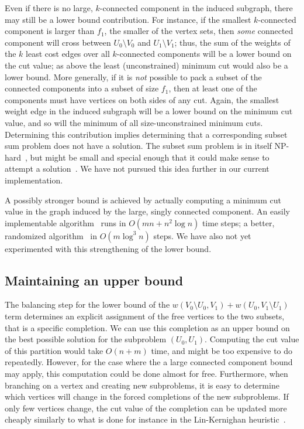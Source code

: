 \documentclass[a4paper,11pt]{article}
\begin{document}
Even if there is no large, $k$-connected component in the induced
subgraph, there may still be a lower bound contribution. For instance,
if the smallest $k$-connected component is larger than $f_1$, the
smaller of the vertex sets, then \emph{some} connected component will
cross between $U_0\setminus V_0$ and $U_1\setminus V_1$; thus, the sum
of the weights of the $k$ least cost edges over all $k$-connected
components will be a lower bound on the cut value; as above the least
(unconstrained) minimum cut would also be a lower bound. More
generally, if it is \emph{not} possible to pack a subset of the
connected components into a subset of size $f_1$, then at least one of
the components must have vertices on both sides of any cut. Again, the
smallest weight edge in the induced subgraph will be a lower bound on
the minimum cut value, and so will the minimum of all
size-unconstrained minimum cuts. Determining this contribution implies
determining that a corresponding subset sum problem does not have a
solution.  The subset sum problem is in itself
NP-hard~\cite{GareyJohnson79}, but might be small and special enough
that it could make sense to attempt a solution~\cite{Pisinger99}. We
have not pursued this idea further in our current implementation.

A possibly stronger bound is achieved by actually computing a minimum
cut value in the graph induced by the large, singly connected
component. An easily implementable algorithm~\cite{StoerWagner97} runs
in $O(mn+n^2\log n)$ time steps; a better, randomized
algorithm~\cite{Karger00} in $O(m\log^3 n)$ steps.  We have also not
yet experimented with this strengthening of the lower bound.

\subsection{Maintaining an upper bound}

The balancing step for the lower bound of the $w(V_0\setminus
U_0,V_1)+w(U_0,V_1\setminus U_1)$ term determines an explicit
assignment of the free vertices to the two subsets, that is a specific
completion. We can use this completion as an upper bound on the best
possible solution for the subproblem $(U_0,U_1)$.  Computing the cut
value of this partition would take $O(n+m)$ time, and might be too
expensive to do repeatedly.  However, for the case where the a large
connected component bound may apply, this computation could be done
almost for free. Furthermore, when branching on a vertex and creating
new subproblems, it is easy to determine which vertices will change in
the forced completions of the new subproblems. If only few vertices
change, the cut value of the completion can be updated more cheaply
similarly to what is done for instance in the Lin-Kernighan
heuristic~\cite{FiducciaMattheyses82,KernighanLin70,Traff06:kpartition}.
\end{document}
